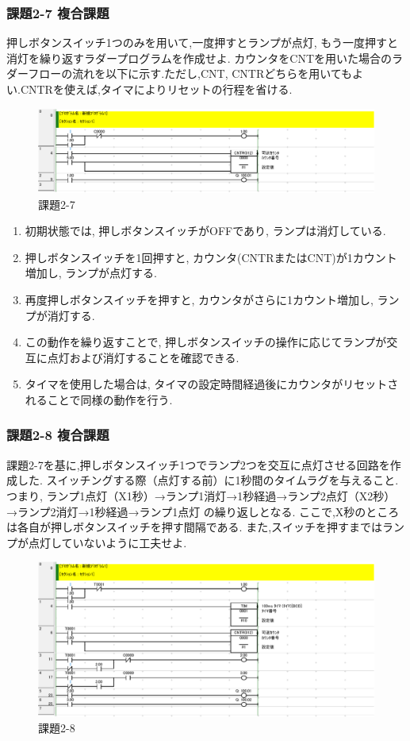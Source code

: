 \subsubsection*{課題2-7 複合課題}
押しボタンスイッチ1つのみを用いて,一度押すとランプが点灯,
もう一度押すと消灯を繰り返すラダープログラムを作成せよ.
カウンタをCNTを用いた場合のラダーフローの流れを以下に示す.ただし,CNT,
CNTRどちらを用いてもよい.CNTRを使えば,タイマによりリセットの行程を省ける.
\begin{figure}[H]
  \centering
  \includegraphics[scale=1]{sozai/2-7-crop.pdf}
  \caption{課題2-7}
\end{figure}
\begin{enumerate}
  \item 初期状態では, 押しボタンスイッチがOFFであり, ランプは消灯している.
  \item 押しボタンスイッチを1回押すと, カウンタ(CNTRまたはCNT)が1カウント増加し, ランプが点灯する.
  \item 再度押しボタンスイッチを押すと, カウンタがさらに1カウント増加し, ランプが消灯する.
  \item この動作を繰り返すことで, 押しボタンスイッチの操作に応じてランプが交互に点灯および消灯することを確認できる.
  \item タイマを使用した場合は, タイマの設定時間経過後にカウンタがリセットされることで同様の動作を行う.
\end{enumerate}


\subsubsection*{課題2-8 複合課題}
課題2-7を基に,押しボタンスイッチ1つでランプ2つを交互に点灯させる回路を作成した.
スイッチングする際（点灯する前）に1秒間のタイムラグを与えること.
つまり,
ランプ1点灯（X1秒）→ランプ1消灯→1秒経過→ランプ2点灯（X2秒）→ランプ2消灯→1秒経過→ランプ1点灯
の繰り返しとなる.
ここで,X秒のところは各自が押しボタンスイッチを押す間隔である.
また,スイッチを押すまではランプが点灯していないように工夫せよ.
\begin{figure}[H]
  \centering
  \includegraphics[scale=1]{sozai/2-8-crop.pdf}
  \caption{課題2-8}
\end{figure}

